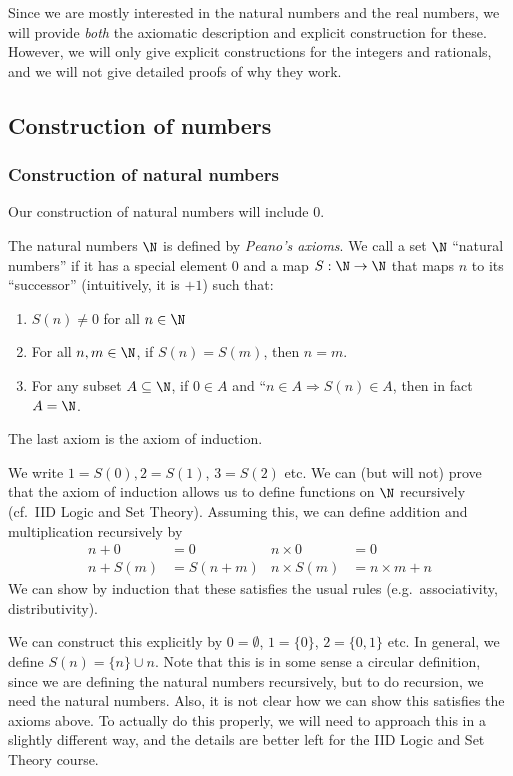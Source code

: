 \documentclass[a4paper]{article}
\begin{document}
Since we are mostly interested in the natural numbers and the real numbers, we will provide \emph{both} the axiomatic description and explicit construction for these. However, we will only give explicit constructions for the integers and rationals, and we will not give detailed proofs of why they work.

\subsection{Construction of numbers}
\subsubsection*{Construction of natural numbers}
Our construction of natural numbers will include $0$.

\begin{defi}
  The natural numbers $\N$ is defined by \emph{Peano's axioms}. We call a set $\N$ ``natural numbers'' if it has a special element $0$ and a map $S: \N \to \N$ that maps $n$ to its ``successor'' (intuitively, it is $+1$) such that:
  \begin{enumerate}
    \item $S(n) \not= 0$ for all $n \in \N$
    \item For all $n, m \in \N$, if $S(n) = S(m)$, then $n = m$.
    \item For any subset $A \subseteq \N$, if $0 \in A$ and ``$n \in A \Rightarrow S(n) \in A$, then in fact $A = \N$.
  \end{enumerate}
  The last axiom is the axiom of induction.

  We write $1 = S(0), 2 = S(1)$, $3 = S(2)$ etc. We can (but will not) prove that the axiom of induction allows us to define functions on $\N$ recursively (cf.\ IID Logic and Set Theory). Assuming this, we can define addition and multiplication recursively by
  \begin{align*}
    n + 0 &= 0 &n\times 0 &= 0\\
    n + S(m) &= S(n + m) & n \times S(m) &= n \times m + n
  \end{align*}
  We can show by induction that these satisfies the usual rules (e.g.\ associativity, distributivity).
\end{defi}
We can construct this explicitly by $0 = \emptyset$, $1 = \{0\}$, $2 = \{0, 1\}$ etc. In general, we define $S(n) = \{n\} \cup n$. Note that this is in some sense a circular definition, since we are defining the natural numbers recursively, but to do recursion, we need the natural numbers. Also, it is not clear how we can show this satisfies the axioms above. To actually do this properly, we will need to approach this in a slightly different way, and the details are better left for the IID Logic and Set Theory course.
\end{document}
